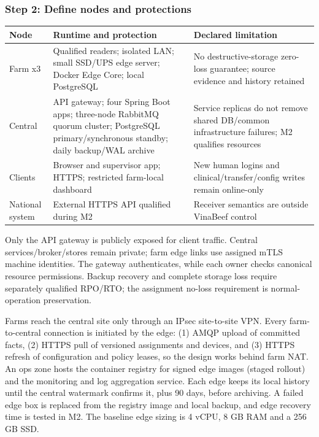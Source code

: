 \subsubsection{Step 2: Define nodes and protections}

{\small
\begin{longtable}[]{|>{\raggedright\arraybackslash}p{}|>{\raggedright\arraybackslash}p{}|>{\raggedright\arraybackslash}p{}|}
\hline
\textbf{Node} & \textbf{Runtime and protection} & \textbf{Declared limitation} \\ \hline
\endhead
Farm x3 & Qualified readers; isolated LAN; small SSD/UPS edge server;
Docker Edge Core; local PostgreSQL & No destructive-storage zero-loss
guarantee; source evidence and history retained \\ \hline
Central & API gateway; four Spring Boot apps; three-node RabbitMQ quorum
cluster; PostgreSQL primary/synchronous standby; daily backup/WAL
archive & Service replicas do not remove shared DB/common infrastructure
failures; M2 qualifies resources \\ \hline
Clients & Browser and supervisor app; HTTPS; restricted farm-local
dashboard & New human logins and clinical/transfer/config writes remain
online-only \\ \hline
National system & External HTTPS API qualified during M2 & Receiver
semantics are outside VinaBeef control \\ \hline
\end{longtable}
}

Only the API gateway is publicly exposed for client traffic. Central
services/broker/stores remain private; farm edge links use assigned mTLS
machine identities. The gateway authenticates, while each owner checks
canonical resource permissions. Backup recovery and complete storage
loss require separately qualified RPO/RTO; the assignment no-loss
requirement is normal-operation preservation.

Farms reach the central site only through an IPsec site-to-site VPN.
Every farm-to-central connection is initiated by the edge: (1) AMQP
upload of committed facts, (2) HTTPS pull of versioned assignments and
devices, and (3) HTTPS refresh of configuration and policy leases, so
the design works behind farm NAT. An ops zone hosts the container
registry for signed edge images (staged rollout) and the monitoring and
log aggregation service. Each edge keeps its local history until the
central watermark confirms it, plus 90 days, before archiving. A failed
edge box is replaced from the registry image and local backup, and edge
recovery time is tested in M2. The baseline edge sizing is 4 vCPU, 8 GB
RAM and a 256 GB SSD.

